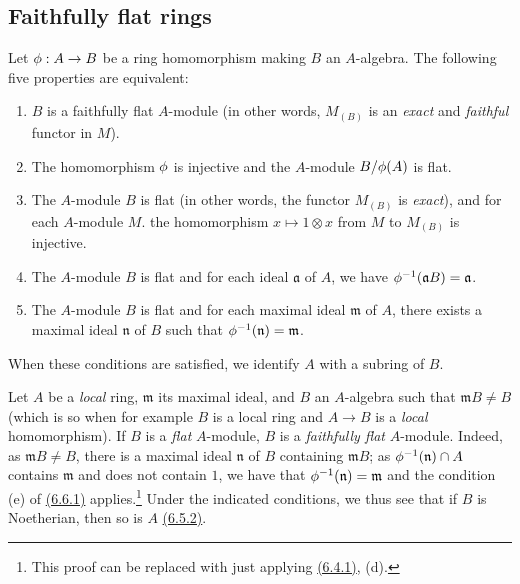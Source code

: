 \subsection{Faithfully flat rings}
\label{subsection-faithfullu-flat-rings}

\begin{env}[6.6.1]
\label{0.6.6.1}
Let $\phi:A\to B$ be a ring homomorphism making $B$ an $A$-algebra. The following five
properties are equivalent:
\begin{enumerate}[label=(\alph*)]
  \item $B$ is a faithfully flat $A$-module (in other words, $M_{(B)}$ is an {\em exact}
    and {\em faithful} functor in $M$).
  \item The homomorphism $\phi$ is injective and the $A$-module $B/\phi(A)$ is flat.
  \item The $A$-module $B$ is flat (in other words, the functor $M_{(B)}$ is {\em exact}),
    and for each $A$-module $M$. the homomorphism $x\mapsto 1\otimes x$ from $M$ to $M_{(B)}$ is
    injective.
  \item The $A$-module $B$ is flat and for each ideal $\mathfrak{a}$ of $A$, we have
    $\phi^{-1}(\mathfrak{a}B)=\mathfrak{a}$.
  \item The $A$-module $B$ is flat and for each maximal ideal $\mathfrak{m}$ of $A$, there
    exists a maximal ideal $\mathfrak{n}$ of $B$ such that $\phi^{-1}(\mathfrak{n})=\mathfrak{m}$.
\end{enumerate}

When these conditions are satisfied, we identify $A$ with a subring of $B$.
\end{env}

\begin{env}[6.6.2]
\label{0.6.6.2}
Let $A$ be a {\em local} ring, $\mathfrak{m}$ its maximal ideal, and $B$ an $A$-algebra such
that $\mathfrak{m}B\neq B$ (which is so when for example $B$ is a local ring and $A\to B$ is
a {\em local} homomorphism). If $B$ is a {\em flat} $A$-module, $B$ is a {\em faithfully
flat} $A$-module. Indeed, as $\mathfrak{m}B\neq B$, there is a maximal ideal $\mathfrak{n}$
of $B$ containing $\mathfrak{m}B$; as $\phi^{-1}(\mathfrak{n})\cap A$ contains
$\mathfrak{m}$ and does not contain $1$, we have that $\phi^{-1}(\mathfrak{n})=\mathfrak{m}$
and the condition (e) of \hyperref[0.6.6.1]{(6.6.1)} applies.\footnote{This proof can be
replaced with just applying \hyperref[0.6.4.1]{(6.4.1)}, (d).} Under the indicated
conditions, we thus see that if $B$ is Noetherian, then so is
$A$ \hyperref[0.6.5.2]{(6.5.2)}.
\end{env}

